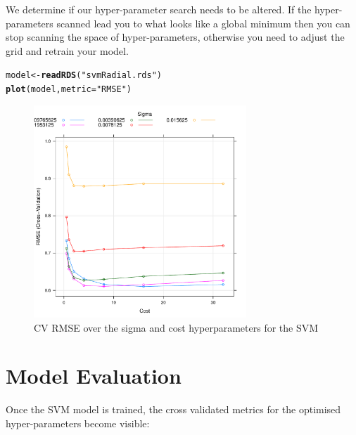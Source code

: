 \documentclass[twoside,a4wide,12pt]{article}\usepackage[]{graphicx}\usepackage[]{color}
\makeatletter
\newcommand{\hlstr}[1]{\textcolor[rgb]{0.192,0.494,0.8}{#1}}%
\newcommand{\hlstd}[1]{\textcolor[rgb]{0.345,0.345,0.345}{#1}}%
\newcommand{\hlkwb}[1]{\textcolor[rgb]{0.69,0.353,0.396}{#1}}%
\newcommand{\hlkwc}[1]{\textcolor[rgb]{0.333,0.667,0.333}{#1}}%
\newcommand{\hlkwd}[1]{\textcolor[rgb]{0.737,0.353,0.396}{\textbf{#1}}}%
\newenvironment{kframe}{%
 \def\at@end@of@kframe{}%
 \ifinner\ifhmode%
  \def\at@end@of@kframe{\end{minipage}}%
  \begin{minipage}{\columnwidth}%
 \fi\fi%
 \def\FrameCommand##1{\hskip\@totalleftmargin \hskip-\fboxsep
 \colorbox{shadecolor}{##1}\hskip-\fboxsep
     \hskip-\linewidth \hskip-\@totalleftmargin \hskip\columnwidth}%
 \MakeFramed {\advance\hsize-\width
   \@totalleftmargin\z@ \linewidth\hsize
   \@setminipage}}%
 {\par\unskip\endMakeFramed%
 \at@end@of@kframe}
\newenvironment{knitrout}{}{} %
\makeatother
\begin{document}
We determine if our hyper-parameter search needs to be altered. If the hyper-parameters scanned lead you to what looks like a global minimum then you can stop scanning the space of hyper-parameters, otherwise you need to adjust the grid and retrain your model.
\begin{knitrout}
\color{fgcolor}\begin{kframe}
\begin{alltt}
\hlstd{model} \hlkwb{<-} \hlkwd{readRDS}\hlstd{(}\hlstr{"svmRadial.rds"}\hlstd{)}
\hlkwd{plot}\hlstd{(model,} \hlkwc{metric} \hlstd{=} \hlstr{"RMSE"}\hlstd{)}
\end{alltt}
\end{kframe}\begin{figure}[]


{\centering \includegraphics[width=8cm]{figure/unnamed-chunk-15} 

}

\caption[CV RMSE over the sigma and cost hyperparameters for the SVM]{CV RMSE over the sigma and cost hyperparameters for the SVM\label{fig:unnamed-chunk-15}}
\end{figure}


\end{knitrout}

\section{Model Evaluation}

Once the SVM model is trained, the cross validated metrics for the optimised hyper-parameters become visible:
\end{document}
